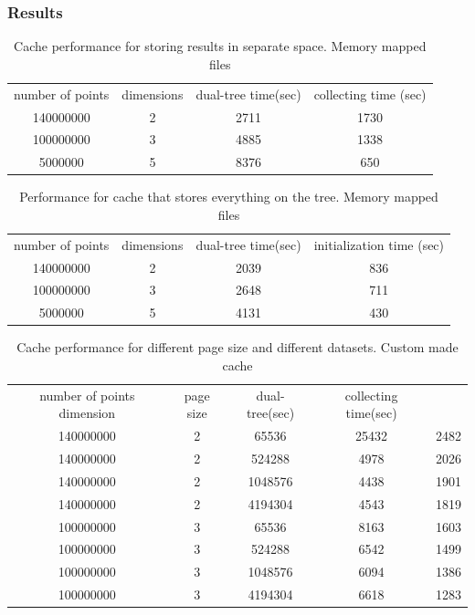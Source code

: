 \documentclass[12pt,letterpaper,doublespaced,ETD,dvips,proposal]{gtthesis}
\begin{document}
\begin{Body}
\subsubsection{Results}
\begin{table}[!htb]
\footnotesize{ \centering
\begin{tabular}{|c|c|c|c|}
  \hline
  number of points & dimensions & dual-tree time(sec)& collecting time (sec)\\
  140000000        & 2          & 2711               & 1730\\
  100000000        & 3          & 4885               & 1338\\
  5000000          & 5          & 8376               & 650\\
  \hline
\end{tabular}
\caption{Cache performance for storing results in separate space. Memory mapped files}
}
\end{table}

\begin{table}[!htb]
\footnotesize{ \centering
\begin{tabular}{|c|c|c|c|}
  \hline
  number of points & dimensions & dual-tree time(sec)& initialization time (sec)\\
  140000000 & 2 & 2039 & 836\\
  100000000 & 3 & 2648 & 711\\
  5000000   & 5 & 4131 & 430\\
  \hline
\end{tabular}
\caption{Performance for cache that stores everything on the tree. Memory mapped files}
}
\end{table}

\begin{table}[!htb]
\footnotesize{ \centering
\begin{tabular}{|c|c|c|c|c|}
  \hline
   number of points dimension & page size & dual-tree(sec) &collecting time(sec) \\
   140000000 & 2 & 65536   & 25432 & 2482 \\
   140000000 & 2 & 524288  & 4978  & 2026 \\
   140000000 & 2 & 1048576 & 4438  & 1901 \\
   140000000 & 2 & 4194304 & 4543  & 1819 \\
   100000000 & 3 & 65536   & 8163  & 1603 \\
   100000000 & 3 & 524288  & 6542  & 1499 \\
   100000000 & 3 & 1048576 & 6094  & 1386 \\
   100000000 & 3 & 4194304 & 6618  & 1283 \\
 \hline
\end{tabular}
\caption{Cache performance for different page size and different datasets. Custom made cache}
}
\end{table}



\end{Body}
\end{document}
